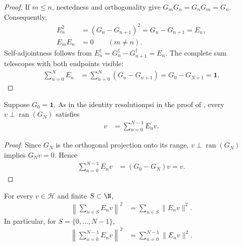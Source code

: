 \begin{proof}
    \leanok
    If $m\leq n$, nestedness and orthogonality give
    $G_mG_n=G_nG_m=G_n$.  Consequently,
    \begin{align}
        E_n^2
               & =(G_n-G_{n+1})^2
        =G_n-G_{n+1}=E_n,          \\
        E_mE_n & =0\qquad(m\ne n).
    \end{align}
    Self-adjointness follows from
    $E_n^\dagger=G_n^\dagger-G_{n+1}^\dagger=E_n$.
    The complete sum telescopes with both endpoints visible:
    \begin{align}
        \sum_{n=0}^{N}E_n
         & =\sum_{n=0}^{N}(G_n-G_{n+1})
        =G_0-G_{N+1}=\mathbf 1.
    \end{align}
\end{proof}

\begin{lemma}%
    \label{thm:truncated-martingale-difference-reconstruction}
    \leanok
    Suppose $G_0=\mathbf 1$.  As in the identity \textup{resolutionpsi} in
    the proof of \cite[Theorem~2.1(i)]{Nachtergaele1996Spectral}, every
    $v\perp\operatorname{ran}(G_N)$ satisfies
    \begin{align}
        v & =\sum_{n=0}^{N-1}E_nv.
    \end{align}
\end{lemma}

\begin{proof}
    \leanok
    Since $G_N$ is the orthogonal projection onto its range,
    $v\perp\operatorname{ran}(G_N)$ implies $G_Nv=0$.  Hence
    \begin{align}
        \sum_{n=0}^{N-1}E_nv
         & =(G_0-G_N)v=v.
    \end{align}
\end{proof}

\begin{lemma}%
    \label{thm:martingale-difference-pythagorean-identity}
    \leanok
    For every $v\in\mathcal H$ and finite $S\subset\N$,
    \begin{align}
        \left\lVert\sum_{n\in S}E_nv\right\rVert^2
         & =\sum_{n\in S}\lVert E_nv\rVert^2.
    \end{align}
    In particular, for $S=\{0,\ldots,N-1\}$,
    \begin{align}
        \left\lVert\sum_{n=0}^{N-1}E_nv\right\rVert^2
         & =\sum_{n=0}^{N-1}\lVert E_nv\rVert^2.
    \end{align}
\end{lemma}

